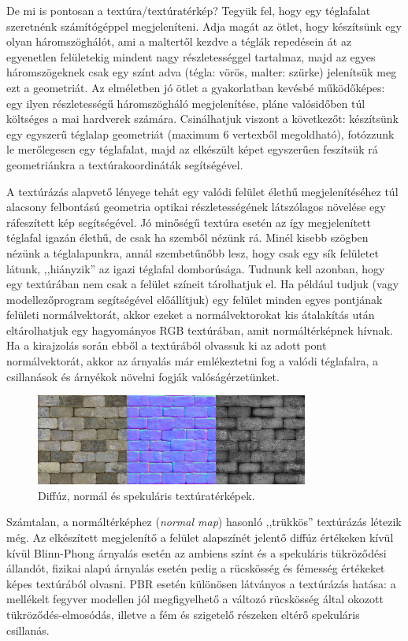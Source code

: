 De mi is pontosan a textúra/textúratérkép? Tegyük fel, hogy egy téglafalat szeretnénk számítógéppel megjeleníteni. Adja magát az ötlet, hogy készítsünk egy olyan háromszöghálót, ami a maltertől kezdve a téglák repedésein át az egyenetlen felületekig mindent nagy részletességgel tartalmaz, majd az egyes háromszögeknek csak egy színt adva (tégla: vörös, malter: szürke) jelenítsük meg ezt a geometriát. Az elméletben jó ötlet a gyakorlatban kevésbé működőképes: egy ilyen részletességű háromszögháló megjelenítése, pláne valósidőben túl költséges a mai hardverek számára. Csinálhatjuk viszont a következőt: készítsünk egy egyszerű téglalap geometriát (maximum 6 vertexből megoldható), fotózzunk le merőlegesen egy téglafalat, majd az elkészült képet egyszerűen feszítsük rá geometriánkra a textúrakoordináták segítségével.

A textúrázás alapvető lényege tehát egy valódi felület élethű megjelenítéséhez túl alacsony felbontású geometria optikai részletességének látszólagos növelése egy ráfeszített kép segítségével. Jó minőségű textúra esetén az így megjelenített téglafal igazán élethű, de csak ha szemből nézünk rá. Minél kisebb szögben nézünk a téglalapunkra, annál szembetűnőbb lesz, hogy csak egy sík felületet látunk, ,,hiányzik'' az igazi téglafal domborúsága. Tudnunk kell azonban, hogy egy textúrában nem csak a felület színeit tárolhatjuk el. Ha például tudjuk (vagy modellezőprogram segítségével előállítjuk) egy felület minden egyes pontjának felületi normálvektorát, akkor ezeket a normálvektorokat kis átalakítás után eltárolhatjuk egy hagyományos RGB textúrában, amit normáltérképnek hívnak. Ha a kirajzolás során ebből a textúrából olvassuk ki az adott pont normálvektorát, akkor az árnyalás már emlékeztetni fog a valódi téglafalra, a csillanások és árnyékok növelni fogják valóságérzetünket.

\begin{figure}[!ht]
    \centering
    \includegraphics[width=0.8\textwidth]{images/brick_texture_maps.png}
    \caption{Diffúz, normál és spekuláris textúratérképek.}
\end{figure}

Számtalan, a normáltérképhez (\textit{normal map}) hasonló ,,trükkös'' textúrázás létezik még. Az elkészített megjelenítő a felület alapszínét jelentő diffúz értékeken kívül kívül Blinn-Phong árnyalás esetén az ambiens színt és a spekuláris tükröződési állandót, fizikai alapú árnyalás esetén pedig a rücskösség és fémesség értékeket képes textúrából olvasni. PBR esetén különösen látványos a textúrázás hatása: a mellékelt fegyver modellen jól megfigyelhető a változó rücskösség által okozott tükröződés-elmosódás, illetve a fém és szigetelő részeken eltérő spekuláris csillanás.

